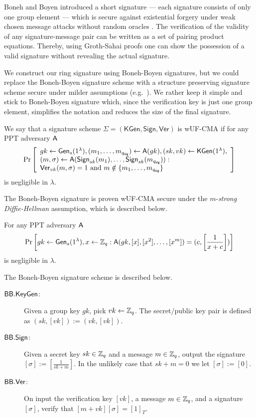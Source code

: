 Boneh and Boyen introduced a short signature --- each signature consists of only one group element --- which is secure against existential forgery under weak chosen message attacks without random oracles \cite{EC:BonBoy04a}.
The verification of the validity of any signature-message pair can be written as a set of pairing product equations. Thereby, using Groth-Sahai proofs one can show the possession of a valid signature without revealing the actual signature.

We construct our ring signature using Boneh-Boyen signatures, but we could replace the Boneh-Boyen signature scheme with a structure preserving signature scheme secure under milder assumptions (e.g.~\cite{EPRINT:JutRoy17}). We rather keep it simple and stick to Boneh-Boyen signature which, since the verification key is just one group element, simplifies the notation and reduces the size of the final signature.
 
\begin{definition} We say that a signature scheme $\Sigma = (\mathsf{KGen},\mathsf{Sign},\mathsf{Ver})$ is wUF-CMA if for any PPT adversary $\mathsf{A}$
	$$
	\Pr\left[\begin{array}{l}
	gk \gets \mathsf{Gen}_s(1^\lambda), (m_1,\ldots,m_{q_\mathsf{sig}})\gets\mathsf{A}(gk), (sk,vk)\gets\mathsf{KGen}(1^\lambda), \\
	(m,\sigma)\gets\mathsf{A}(\mathsf{Sign}_{sk}(m_1),\ldots,\mathsf{Sign}_{sk}(m_{q_\mathsf{sig}})):\\
	\mathsf{Ver}_{vk}(m,\sigma)=1 \text{ and } m\notin \{m_1,\ldots,m_{q_\mathsf{sig}}\}
	\end{array}\right]
	$$
is negligible in $\lambda$.
\end{definition}

The Boneh-Boyen signature is proven wUF-CMA secure under the $m$-\emph{strong Diffie-Hellman} assumption, which is described below.

\begin{definition}
For any PPT adversary $\mathsf{A}$
$$
\Pr\left[gk\gets\mathsf{Gen}_s(1^\lambda),x\gets\mathbb{Z}_q:\mathsf{A}(gk,[x],[x^2],\ldots,[x^m])=(c,\left[\frac{1}{x+c}\right])\right]
$$
is negligible in $\lambda$.
\end{definition}

The Boneh-Boyen signature scheme is described below.

\begin{description}
\item[$\mathsf{BB}.\mathsf{KeyGen}$:] Given a group key $gk$, pick $vk\gets\mathbb{Z}_q$. The secret/public key pair is defined as $(sk,[vk]):=(vk,[vk])$.
\item[$\mathsf{BB}.\mathsf{Sign}$:] Given a secret key $sk\in\mathbb{Z}_q$ and a message $m\in\mathbb{Z}_q$, output the signature $[\sigma]:=\left[\frac{1}{sk+m}\right]$. In the unlikely case that $sk+m=0$ we let $[\sigma]:=[0]$.
\item[$\mathsf{BB}.\mathsf{Ver}$:] On input the verification key $[vk]$, a message $m\in\mathbb{Z}_q$, and a signature $[\sigma]$, verify that $[m+vk][\sigma]=[1]_T$.
\end{description} 

